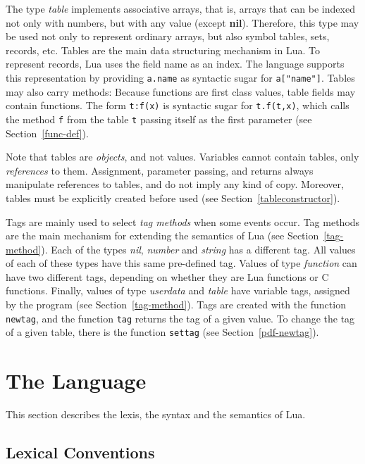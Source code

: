 \documentclass[11pt]{article}
\newcommand{\See}[1]{Section~\ref{#1}}
\newcommand{\see}[1]{(see \See{#1})}
\newcommand{\M}[1]{\emph{#1}}
\newcommand{\nil}{{\bf nil}}
\newcommand{\Index}[1]{#1\index{#1}}
\begin{document}
The type \emph{table} implements \Index{associative arrays},
that is, \Index{arrays} that can be indexed not only with numbers,
but with any value (except \nil).
Therefore, this type may be used not only to represent ordinary arrays,
but also symbol tables, sets, records, etc.
Tables are the main data structuring mechanism in Lua.
To represent \Index{records}, Lua uses the field name as an index.
The language supports this representation by
providing \verb|a.name| as syntactic sugar for \verb|a["name"]|.
Tables may also carry methods:
Because functions are first class values,
table fields may contain functions.
The form \verb|t:f(x)| is syntactic sugar for \verb|t.f(t,x)|,
which calls the method \verb|f| from the table \verb|t| passing
itself as the first parameter \see{func-def}.

Note that tables are \emph{objects}, and not values.
Variables cannot contain tables, only \emph{references} to them.
Assignment, parameter passing, and returns always manipulate references
to tables, and do not imply any kind of copy.
Moreover, tables must be explicitly created before used
\see{tableconstructor}.

Tags are mainly used to select \emph{tag methods} when
some events occur.
Tag methods are the main mechanism for extending the
semantics of Lua \see{tag-method}.
Each of the types \M{nil}, \M{number} and \M{string} has a different tag.
All values of each of these types have this same pre-defined tag.
Values of type \M{function} can have two different tags,
depending on whether they are Lua functions or C functions.
Finally,
values of type \M{userdata} and \M{table} have
variable tags, assigned by the program \see{tag-method}.
Tags are created with the function \verb|newtag|,
and the function \verb|tag| returns the tag of a given value.
To change the tag of a given table,
there is the function \verb|settag| \see{pdf-newtag}.


\section{The Language}

This section describes the lexis, the syntax and the semantics of Lua.


\subsection{Lexical Conventions} \label{lexical}
\end{document}
